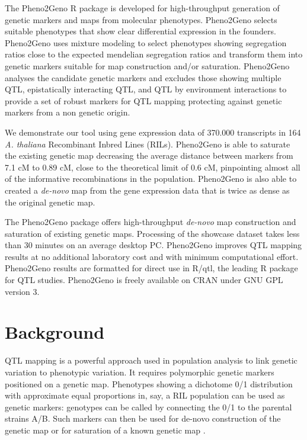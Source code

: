 The Pheno2Geno R package is developed for high-throughput generation of genetic markers and maps from 
molecular phenotypes. Pheno2Geno selects suitable phenotypes that show clear differential expression 
in the founders. Pheno2Geno uses mixture modeling to select phenotypes showing segregation ratios 
close to the expected mendelian segregation ratios and transform them into genetic markers suitable 
for map construction and/or saturation. Pheno2Geno analyses the candidate genetic markers and excludes 
those showing multiple QTL, epistatically interacting QTL, and QTL by environment interactions to 
provide a set of robust markers for QTL mapping protecting against genetic markers from a non genetic 
origin.

We demonstrate our tool using gene expression data of 370.000 transcripts in 164 \emph{A. thaliana} 
Recombinant Inbred Lines (RILs). Pheno2Geno is able to saturate the existing genetic map decreasing 
the average distance between markers from 7.1 cM to 0.89 cM, close to the theoretical limit of 0.6 cM, 
pinpointing almost all of the informative recombinations in the population. Pheno2Geno is also able 
to created a \emph{de-novo} map from the gene expression data that is twice as dense as the original 
genetic map.

The Pheno2Geno package offers high-throughput \emph{de-novo} map construction and saturation of 
existing genetic maps. Processing of the showcase dataset takes less than 30 minutes on an average 
desktop PC. Pheno2Geno improves QTL mapping results at no additional laboratory cost and with 
minimum computational effort. Pheno2Geno results are formatted for direct use in R/qtl, the leading 
R package for QTL studies. Pheno2Geno is freely available on CRAN under GNU GPL version 3.

\section{Background}
QTL mapping \cite{Lander:1989} is a powerful approach used in population analysis to link 
genetic variation to phenotypic variation. It requires polymorphic genetic markers positioned 
on a genetic map. Phenotypes showing a dichotome 0/1 distribution with approximate equal 
proportions in, say, a RIL population can be used as genetic markers: genotypes can be 
called by connecting the 0/1 to the parental strains A/B. Such markers can then be used 
for de-novo construction of the genetic map or for saturation of a known genetic map 
\cite{West:2006, Truco:2013}.

